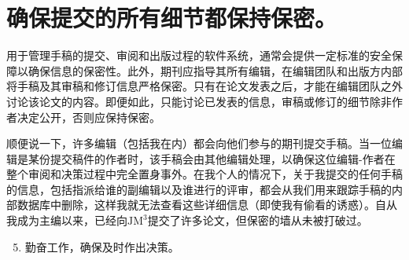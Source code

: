 \section*{确保提交的所有细节都保持保密。}
用于管理手稿的提交、审阅和出版过程的软件系统，通常会提供一定标准的安全保障以确保信息的保密性。此外，期刊应指导其所有编辑，在编辑团队和出版方内部将手稿及其审稿和修订信息严格保密。只有在论文发表之后，才能在编辑团队之外讨论该论文的内容。即便如此，只能讨论已发表的信息，审稿或修订的细节除非作者决定公开，否则应保持保密。

顺便说一下，许多编辑（包括我在内）都会向他们参与的期刊提交手稿。当一位编辑是某份提交稿件的作者时，该手稿会由其他编辑处理，以确保这位编辑-作者在整个审阅和决策过程中完全置身事外。在我个人的情况下，关于我提交的任何手稿的信息，包括指派给谁的副编辑以及谁进行的评审，都会从我们用来跟踪手稿的内部数据库中删除，这样我就无法查看这些详细信息（即使我有偷看的诱惑）。自从我成为主编以来，已经向$\mathrm{JM}^{3}$提交了许多论文，但保密的墙从未被打破过。

\begin{enumerate}
  \setcounter{enumi}{4}
\item 勤奋工作，确保及时作出决策。
\end{enumerate}

